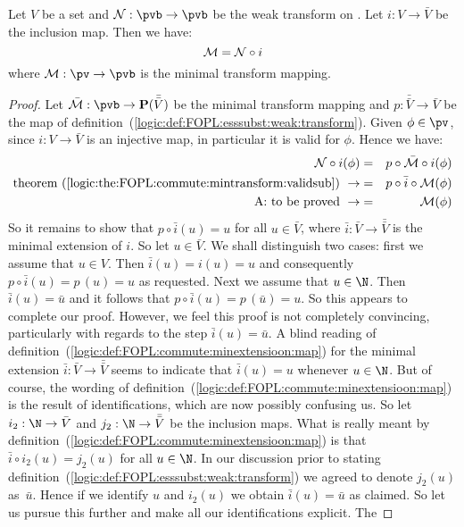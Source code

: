 \begin{lemma}\label{logic:lemma:FOPL:esssubst:MNi}
Let $V$ be a set and ${\cal N}:\pvb\to\pvb$ be the weak transform on
\pvb. Let $i:V\to\bar{V}$ be the inclusion map. Then we have:
    \[
    {\cal M}={\cal N}\circ i
    \]
where ${\cal M}:\pv\to\pvb$ is the minimal transform mapping.
\end{lemma}
\begin{proof}
Let $\bar{\cal M}:\pvb\to{\bf P}(\bar{\bar{V}})$ be the minimal
transform mapping and $p:\bar{\bar{V}}\to\bar{V}$ be the map of
definition~(\ref{logic:def:FOPL:esssubst:weak:transform}). Given
$\phi\in\pv$, since $i:V\to\bar{V}$ is an injective map, in
particular it is valid for $\phi$. Hence we have:
    \begin{eqnarray*}
    {\cal N}\circ i(\phi)&=&p\circ\bar{\cal M}\circ i(\phi)\\
    \mbox{theorem~(\ref{logic:the:FOPL:commute:mintransform:validsub})}\
    \rightarrow&=&p\circ\bar{i}\circ{\cal M}(\phi)\\
    \mbox{A: to be proved}\ \rightarrow&=&{\cal M}(\phi)
    \end{eqnarray*}
So it remains to show that $p\circ\bar{i}(u)=u$ for all
$u\in\bar{V}$, where $\bar{i}:\bar{V}\to\bar{\bar{V}}$ is the
minimal extension of $i$. So let $u\in\bar{V}$. We shall distinguish
two cases: first we assume that $u\in V$. Then $\bar{i}(u)=i(u)=u$
and consequently $p\circ\bar{i}(u)=p\,(u)=u$ as requested. Next we
assume that $u\in\N$. Then $\bar{i}(u)=\bar{u}$ and it follows that
$p\circ\bar{i}(u)=p\,(\bar{u})=u$. So this appears to complete our
proof. However, we feel this proof is not completely convincing,
particularly with regards to the step $\bar{i}(u)=\bar{u}$. A blind
reading of
definition~(\ref{logic:def:FOPL:commute:minextensioon:map}) for the
minimal extension $\bar{i}:\bar{V}\to\bar{\bar{V}}$ seems to
indicate that $\bar{i}(u)=u$ whenever $u\in\N$. But of course, the
wording of
definition~(\ref{logic:def:FOPL:commute:minextensioon:map}) is the
result of identifications, which are now possibly confusing us. So
let $i_{2}:\N\to\bar{V}$ and $j_{2}:\N\to\bar{\bar{V}}$ be the
inclusion maps. What is really meant by
definition~(\ref{logic:def:FOPL:commute:minextensioon:map}) is that
$\bar{i}\circ i_{2}(u)=j_{2}(u)$ for all $u\in\N$. In our discussion
prior to stating
definition~(\ref{logic:def:FOPL:esssubst:weak:transform}) we agreed
to denote $j_{2}(u)$ as~$\bar{u}$. Hence if we identify $u$ and
$i_{2}(u)$ we obtain $\bar{i}(u)=\bar{u}$ as claimed. So let us
pursue this further and make all our identifications explicit. The

\end{proof}
